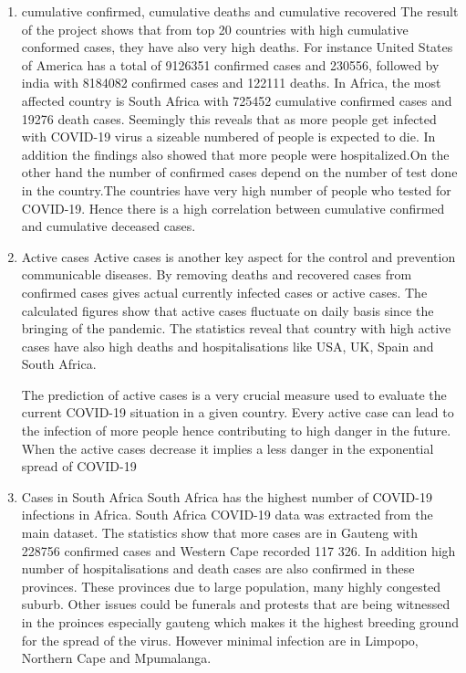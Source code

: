 \documentclass[12pt]{article}
\begin{document}
\begin{enumerate}
    \item cumulative confirmed, cumulative deaths  and cumulative recovered
    The result of the project shows that  from top 20 countries with high cumulative conformed cases, they have also very high deaths. For instance United States of America has a total of 9126351 confirmed cases and 230556, followed by india with 8184082 confirmed cases and 122111 deaths. In Africa, the most affected country is South Africa with 725452 cumulative confirmed cases and 19276 death cases. Seemingly this reveals that as more people get infected with COVID-19 virus a sizeable numbered of people is expected to die. In addition the findings also showed that more people were hospitalized.On the other hand the number of confirmed cases depend on the number of test done in the country.The countries have very high number of people who tested for COVID-19.  Hence there is a high correlation between cumulative confirmed and  cumulative deceased cases. 
    
    \item Active cases
    Active cases is another key aspect for the control and prevention communicable diseases. By removing deaths and recovered cases from confirmed cases gives actual currently infected cases or active cases. The calculated figures show that active cases fluctuate on  daily basis since the bringing of the pandemic. The statistics reveal that country with high active cases have also high deaths and hospitalisations like USA, UK, Spain and South Africa.
    
    The prediction of active cases is a very crucial measure used to evaluate the current COVID-19 situation in a given country. Every active case can lead to the infection of more people hence contributing to high danger in the future. When the active cases decrease it implies a less danger in the  exponential spread of COVID-19
    
    \item Cases in South Africa
    South Africa has the highest number of  COVID-19 infections in Africa. South Africa COVID-19 data was extracted from the main dataset. The statistics show that more cases are in Gauteng with 228756 confirmed cases and Western Cape recorded 117 326.  In addition high  number of hospitalisations and death cases are also confirmed in these provinces. These provinces due to large population, many highly congested suburb. Other issues could be funerals and protests that are being witnessed in the proinces especially gauteng which makes it the highest breeding ground for the spread of the virus. However minimal infection are in Limpopo, Northern Cape and Mpumalanga. 
    

\end{enumerate}
\end{document}

